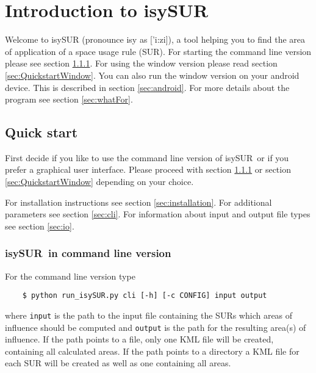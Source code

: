 \documentclass[11pt,fleqn]{book} %
\newcommand{\ProjectTitle}{isySUR}
\newcommand{\pt}{\ProjectTitle}
\begin{document}

\pagestyle{empty} %

\setcounter{tocdepth}{3}
\tableofcontents %

\cleardoublepage %

\pagestyle{fancy} %


\chapter{Introduction to \ProjectTitle}
Welcome to isySUR (pronounce isy as ['i:zi]), a tool helping you to find the area of application of a space usage rule (SUR). For starting the command line version please see section \ref{sec:QuickstartTerminal}. For using the window version please read section \ref{sec:QuickstartWindow}. You can also run the window version on your android device. This is described in section \ref{sec:android}. For more details about the program see section \ref{sec:whatFor}.

\section{Quick start}
First decide if you like to use the command line version of \pt\ or if you prefer a graphical user interface. Please proceed with section \ref{sec:QuickstartTerminal} or section \ref{sec:QuickstartWindow} depending on your choice.

For installation instructions see section \ref{sec:installation}. For additional parameters see section \ref{sec:cli}. For information about input and output file types see section \ref{sec:io}.

\subsection{\ProjectTitle\ in command line version}\label{sec:QuickstartTerminal}
For the command line version type
\begin{verbatim}
	$ python run_isySUR.py cli [-h] [-c CONFIG] input output
\end{verbatim}
where \texttt{input} is the path to the input file containing the SURs which areas of influence should be computed and \texttt{output} is the path for the resulting area(s) of influence. If the path points to a file, only one KML file will be created, containing all calculated areas. If the path points to a directory a KML file for each SUR will be created as well as one containing all areas.
\end{document}
